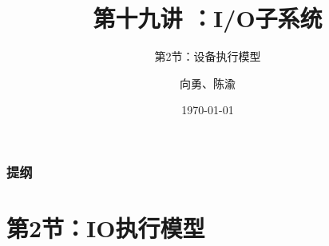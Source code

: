 


\title[第19讲]{第十九讲 ：I/O子系统} %
\subtitle{第2节：设备执行模型}
\author{向勇、陈渝} %
\date{\today} %



\begin{frame}
\titlepage %
\end{frame}

\begin{frame}
\frametitle{提纲} %
\tableofcontents %


\end{frame}
\section{第2节：IO执行模型} %
